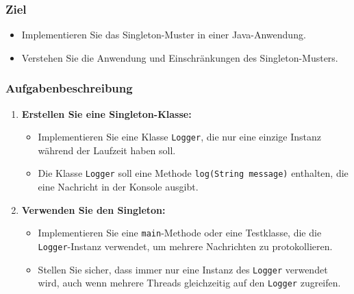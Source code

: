 
\begin{frame}
\frametitle{Ziel}
\begin{itemize}
    \item Implementieren Sie das Singleton-Muster in einer Java-Anwendung.
    \item Verstehen Sie die Anwendung und Einschränkungen des Singleton-Musters.
\end{itemize}
\end{frame}

\begin{frame}
\frametitle{Aufgabenbeschreibung}
\begin{enumerate}
    \item \textbf{Erstellen Sie eine Singleton-Klasse:}
    \begin{itemize}
        \item Implementieren Sie eine Klasse \texttt{Logger}, die nur eine einzige Instanz während der Laufzeit haben soll.
        \item Die Klasse \texttt{Logger} soll eine Methode \texttt{log(String message)} enthalten, die eine Nachricht in der Konsole ausgibt.
    \end{itemize}
    
    \item \textbf{Verwenden Sie den Singleton:}
    \begin{itemize}
        \item Implementieren Sie eine \texttt{main}-Methode oder eine Testklasse, die die \texttt{Logger}-Instanz verwendet, um mehrere Nachrichten zu protokollieren.
        \item Stellen Sie sicher, dass immer nur eine Instanz des \texttt{Logger} verwendet wird, auch wenn mehrere Threads gleichzeitig auf den \texttt{Logger} zugreifen.
    \end{itemize}
\end{enumerate}
\end{frame}